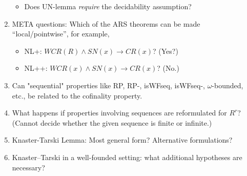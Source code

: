 \documentclass{scrartcl}
\begin{document}
\begin{enumerate}
\begin{itemize}
        \item Does UN-lemma \emph{require} the decidability assumption?
      \end{itemize}
    \item META questions: Which of the ARS theorems can be made ``local/pointwise'',
    for example,
    \begin{itemize}
      \item NL+: $WCR(R) \land SN(x) \to CR(x)$?  (Yes?)
      \item NL++: $WCR(x) \land SN(x) \to CR(x)$? (No.)
    \end{itemize}
    \item Can "sequential" properties like RP, RP-, isWFseq, isWFseq-, $\omega$-bounded, etc.,
      be related to the cofinality property.
      \item What happens if properties involving sequences are reformulated for
    $R^r$? (Cannot decide whether the given sequence is finite or infinite.)
    \item Knaster-Tarski Lemma: Most general form? Alternative formulations?
    \item Knaster--Tarski in a well-founded setting: what additional
    hypotheses are necessary?
  \end{enumerate}
\end{document}
